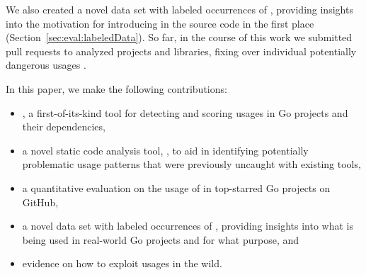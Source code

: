 We also created a novel data set with  labeled occurrences of \unsafe{}, providing insights into the motivation for introducing \unsafe{} in the source code in the first place (Section~\ref{sec:eval:labeledData}). 
So far, in the course of this work we submitted \numberPRs{} pull requests to analyzed projects and libraries, fixing over \numberBugsFixed{} individual potentially dangerous \unsafe{} usages . %

In this paper, we make the following contributions:
%
\begin{itemize}
\item \toolUsage{}, a first-of-its-kind tool for detecting and scoring \unsafe{} usages in Go projects and their dependencies,
\item a novel static code analysis tool, \toolSA{}, to aid in identifying potentially problematic \unsafe{} usage patterns that were previously uncaught with existing tools,
\item a quantitative evaluation on the usage of \unsafe{} in \projsAnalyzed{} top-starred Go projects on GitHub,
\item a novel data set with  labeled occurrences of \unsafe{}, providing insights into what is being used in real-world Go projects and for what purpose, and
\item evidence on how to exploit \unsafe{} usages in the wild.
\end{itemize}

